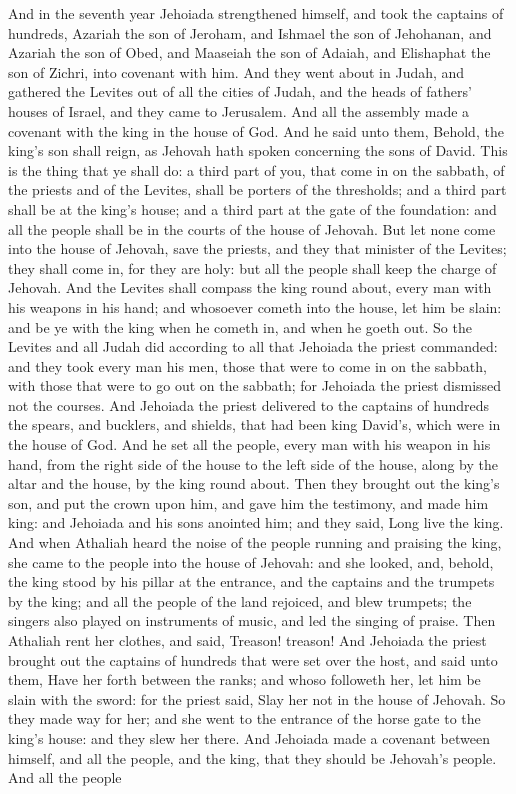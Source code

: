 And in the seventh year Jehoiada strengthened himself, and took the captains of hundreds, Azariah the son of Jeroham, and Ishmael the son of Jehohanan, and Azariah the son of Obed, and Maaseiah the son of Adaiah, and Elishaphat the son of Zichri, into covenant with him. And they went about in Judah, and gathered the Levites out of all the cities of Judah, and the heads of fathers’ houses of Israel, and they came to Jerusalem. And all the assembly made a covenant with the king in the house of God. And he said unto them, Behold, the king’s son shall reign, as Jehovah hath spoken concerning the sons of David. This is the thing that ye shall do: a third part of you, that come in on the sabbath, of the priests and of the Levites, shall be porters of the thresholds; and a third part shall be at the king’s house; and a third part at the gate of the foundation: and all the people shall be in the courts of the house of Jehovah. But let none come into the house of Jehovah, save the priests, and they that minister of the Levites; they shall come in, for they are holy: but all the people shall keep the charge of Jehovah. And the Levites shall compass the king round about, every man with his weapons in his hand; and whosoever cometh into the house, let him be slain: and be ye with the king when he cometh in, and when he goeth out.  So the Levites and all Judah did according to all that Jehoiada the priest commanded: and they took every man his men, those that were to come in on the sabbath, with those that were to go out on the sabbath; for Jehoiada the priest dismissed not the courses. And Jehoiada the priest delivered to the captains of hundreds the spears, and bucklers, and shields, that had been king David’s, which were in the house of God. And he set all the people, every man with his weapon in his hand, from the right side of the house to the left side of the house, along by the altar and the house, by the king round about. Then they brought out the king’s son, and put the crown upon him, and gave him the testimony, and made him king: and Jehoiada and his sons anointed him; and they said, Long live the king.  And when Athaliah heard the noise of the people running and praising the king, she came to the people into the house of Jehovah: and she looked, and, behold, the king stood by his pillar at the entrance, and the captains and the trumpets by the king; and all the people of the land rejoiced, and blew trumpets; the singers also played on instruments of music, and led the singing of praise. Then Athaliah rent her clothes, and said, Treason! treason! And Jehoiada the priest brought out the captains of hundreds that were set over the host, and said unto them, Have her forth between the ranks; and whoso followeth her, let him be slain with the sword: for the priest said, Slay her not in the house of Jehovah. So they made way for her; and she went to the entrance of the horse gate to the king’s house: and they slew her there.  And Jehoiada made a covenant between himself, and all the people, and the king, that they should be Jehovah’s people. And all the people 